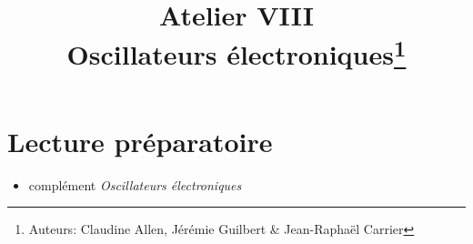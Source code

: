 \documentclass[canadien,12pt,oneside,letterpaper]{article}
\title{\textbf{Atelier VIII}\\Oscillateurs électroniques\thanks{Auteurs: Claudine Allen, Jérémie Guilbert \& Jean-Raphaël Carrier}}
\date{}
\begin{document}
\maketitle \vspace{-2cm}





\section{Lecture préparatoire}
\begin{itemize}
\item complément \textit{Oscillateurs électroniques}
\end{itemize}
\vspace{-1ex}
\end{document}
